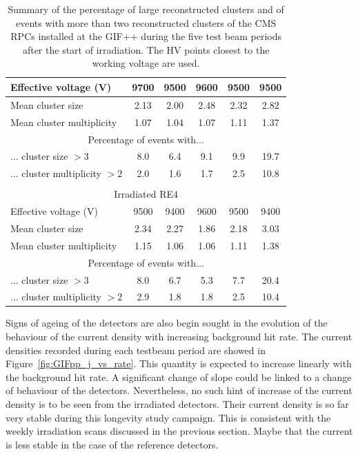 \begin{table}[H]
\begin{tabular}{|l|*{5}{c|}}
			\hline
			Effective voltage (V)         & 9700 & 9500 & 9600 & 9500 & 9500 \\
			\hline
			Mean cluster size             & 2.13 & 2.00 & 2.48 & 2.32 & 2.82 \\
			\hline
			Mean cluster multiplicity     & 1.07 & 1.04 & 1.07 & 1.11 & 1.37 \\
			\hline
			\multicolumn{6}{|c|}{Percentage of events with...}               \\
			\hline
			... cluster size $>3$         & 8.0  & 6.4  & 9.1  & 9.9  & 19.7 \\
			\hline
			... cluster multiplicity $>2$ & 2.0  & 1.6  & 1.7  & 2.5  & 10.8 \\
			\hline
			\multicolumn{6}{c}{}                                             \\
			\hline
			\multicolumn{6}{|c|}{Irradiated RE4}                             \\
			\hline
			Effective voltage (V)         & 9500 & 9400 & 9600 & 9500 & 9400 \\
			\hline
			Mean cluster size             & 2.34 & 2.27 & 1.86 & 2.18 & 3.03 \\
			\hline
			Mean cluster multiplicity     & 1.15 & 1.06 & 1.06 & 1.11 & 1.38 \\
			\hline
			\multicolumn{6}{|c|}{Percentage of events with...}               \\
			\hline
			... cluster size $>3$         & 8.0  & 6.7  & 5.3  & 7.7  & 20.4 \\
			\hline
			... cluster multiplicity $>2$ & 2.9  & 1.8  & 1.8  & 2.5  & 10.4 \\
			\hline
		\end{tabular}
		\caption{\label{tab:clusters} Summary of the percentage of large reconstructed clusters and of events with more than two reconstructed clusters of the CMS RPCs installed at the GIF++ during the five test beam periods after the start of irradiation. The HV points closest to the working voltage are used.}
	\end{table}
	
	Signs of ageing of the detectors are also begin sought in the evolution of the behaviour of the current density with increasing background hit rate. The current densities recorded during each testbeam period are showed in Figure~\ref{fig:GIFpp_j_vs_rate}. This quantity is expected to increase linearly with the background hit rate. A significant change of slope could be linked to a change of behaviour of the detectors. Nevertheless, no such hint of increase of the current density is to be seen from the irradiated detectors. Their current density is so far very stable during this longevity study campaign. This is consistent with the weekly irradiation scans discussed in the previous section. Maybe that the current is less stable in the case of the reference detectors.
	
